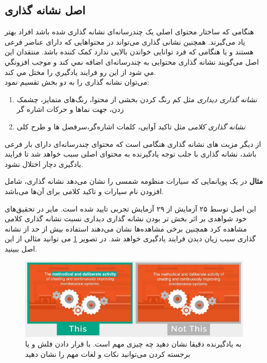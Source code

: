 \subsection{اصل نشانه گذاری}
هنگامی که ساختار محتوای اصلی یک چندرسانه‌ای نشانه گذاری شده باشد افراد بهتر یاد می‌گیرند. همچنین نشانی گذاری می‌تواند در محتواهایی که دارای عناصر فرعی هستند و یا هنگامی که فرد توانایی خواندن بالایی ندارد کمک کننده باشد. منتقدان این اصل می‌گویند نشانه گذاری محتوایی به چندرسانه‌ای اضافه نمي کند و موجب افزونگي مي شود از اين رو فرايند يادگيري را مختل مي کند.
\\
می‌توان نشانه گذاری را به دو بخش تقسیم نمود:
\begin{enumerate}
\item
\textit{نشانه گذاری دیداری}
مثل کم رنگ کردن بخشی از محتوا، رنگ‌های متمایز، چشمک زدن، جهت نماها و حرکات اشاره گر
\item
\textit{نشانه گذاری کلامی}
مثل تاکید آوایی، کلمات اشاره‌گر،‌سرفصل ها و طرح کلی
\end{enumerate}
از دیگر مزیت های نشانه گذاری هنگامی است که محتوای چندرسانه‌ای دارای بار فرعی باشد، نشانه گذاری با جلب توجه یادگیرنده به محتوای اصلی سبب خواهد شد تا فرایند یادگیری دچار اختلال نشود.

\textbf{مثال}
در یک پویانمایی که سیارات منظومه شمسی را نشان می‌دهد نشانه گذاری، شامل افزودن نام سیارات و تاکید کلامی برای آن‌ها می‌باشد.

این اصل توسط ۲۵ آزمایش از ۲۹ آزمایش تجربی تایید شده است. مایر در تحقیق‌های خود شواهدی بر اثر بخش تر بودن نشانه گذاری دیداری نسبت نشانه گذاری کلامی مشاهده کرد همچنین برخی مشاهد‌‌ه‌ها نشان می‌دهند استفاده بیش از حد از نشانه گذاری‌ سبب زیان دیدن فرایند یادگیری خواهد شد.
در تصویر
\ref{fig:signalingexample}
می توانید مثالی از این اصل ببینید.
\begin{figure}[htbp]
	\centering
	\includegraphics[width=0.7\linewidth]{figures/Signaling_example}
	\caption[مثال اصل نشانه گذاری]{به یادگیرنده دقیقا نشان دهید چه چیزی مهم است. با قرار دادن فلش و یا برجسته کردن می‌توانید نکات و لغات مهم را نشان دهید}
	\label{fig:signalingexample}
\end{figure}

